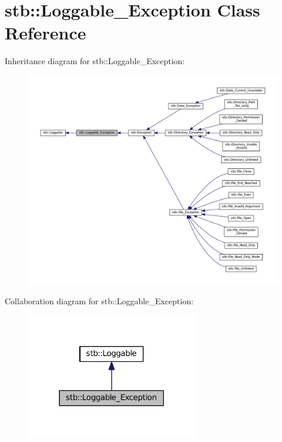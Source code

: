 \hypertarget{classstb_1_1Loggable__Exception}{\section{stb\+:\+:Loggable\+\_\+\+Exception Class Reference}
\label{classstb_1_1Loggable__Exception}
}


Inheritance diagram for stb\+:\+:Loggable\+\_\+\+Exception\+:
\nopagebreak
\begin{figure}[H]
\begin{center}
\leavevmode
\includegraphics[width=350pt]{classstb_1_1Loggable__Exception__inherit__graph}
\end{center}
\end{figure}


Collaboration diagram for stb\+:\+:Loggable\+\_\+\+Exception\+:
\nopagebreak
\begin{figure}[H]
\begin{center}
\leavevmode
\includegraphics[width=213pt]{classstb_1_1Loggable__Exception__coll__graph}
\end{center}
\end{figure}
